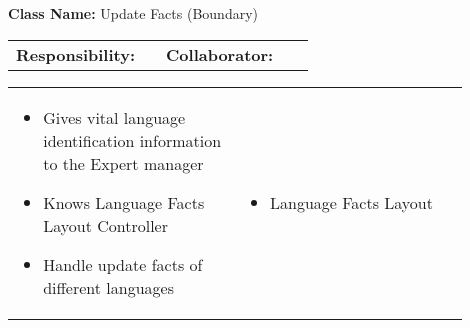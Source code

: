 \begin{cards}[]
    \textbf{Class Name:} Update Facts (Boundary)
    \tcbline
    \begin{tabular}{p{0.45\linewidth} | p{0.45\linewidth}}
        \textbf{Responsibility:}& 
        \textbf{Collaborator:}\\
    \end{tabular}
    \tcbline
    \begin{tabular}{p{0.45\linewidth} | p{0.45\linewidth}}
        \begin{itemize}
            \item Gives vital language identification information to the Expert manager
            \item Knows Language Facts Layout Controller
            \item Handle update facts of different languages
        \end{itemize}
        &
        \begin{itemize}
            \item Language Facts Layout
        \end{itemize}
    \end{tabular}
\end{cards}